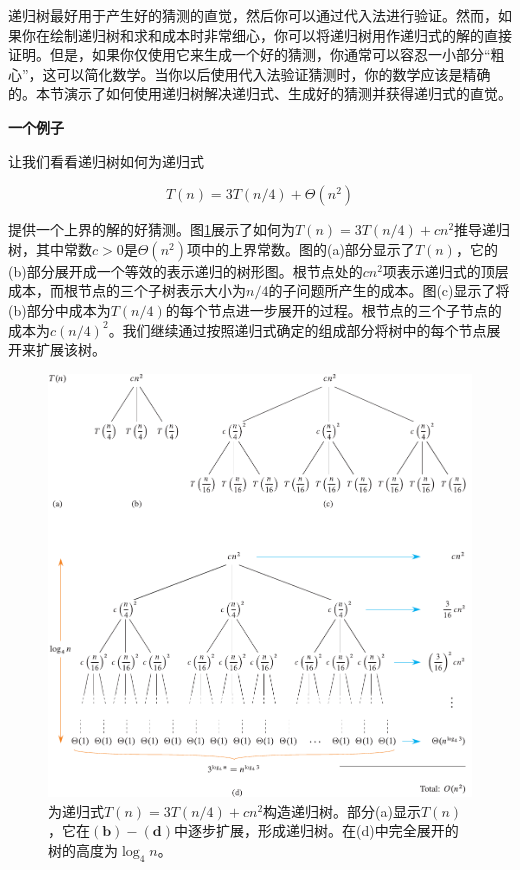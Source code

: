 \documentclass[lang=cn,newtx,10pt,scheme=chinese]{elegantbook}
\begin{document}
递归树最好用于产生好的猜测的直觉，然后你可以通过代入法进行验证。然而，如果你在绘制递归树和求和成本时非常细心，你可以将递归树用作递归式的解的直接证明。但是，如果你仅使用它来生成一个好的猜测，你通常可以容忍一小部分“粗心”，这可以简化数学。当你以后使用代入法验证猜测时，你的数学应该是精确的。本节演示了如何使用递归树解决递归式、生成好的猜测并获得递归式的直觉。

\textbf{一个例子}

让我们看看递归树如何为递归式

\begin{equation}
T(n)=3 T(n / 4)+\Theta(n^2)
\end{equation}

提供一个上界的解的好猜测。图\ref{fig:4-1}展示了如何为$T(n)=3 T(n / 4)+c n^2$推导递归树，其中常数$c>0$是$\Theta(n^2)$项中的上界常数。图的(a)部分显示了$T(n)$，它的(b)部分展开成一个等效的表示递归的树形图。根节点处的$c n^2$项表示递归式的顶层成本，而根节点的三个子树表示大小为$n / 4$的子问题所产生的成本。图(c)显示了将(b)部分中成本为$T(n / 4)$的每个节点进一步展开的过程。根节点的三个子节点的成本为$c(n / 4)^2$。我们继续通过按照递归式确定的组成部分将树中的每个节点展开来扩展该树。

\begin{figure}[htbp]
    \centering
    \includegraphics{算法导论第四版插图/第四章/4-1.pdf}
    \caption{为递归式$T(n)=3 T(n/4)+cn^2$构造递归树。部分(a)显示$T(n)$，它在$(\mathbf{b})-(\mathbf{d})$中逐步扩展，形成递归树。在(d)中完全展开的树的高度为$\log_4 n$。}
    \label{fig:4-1}
\end{figure}
\end{document}

